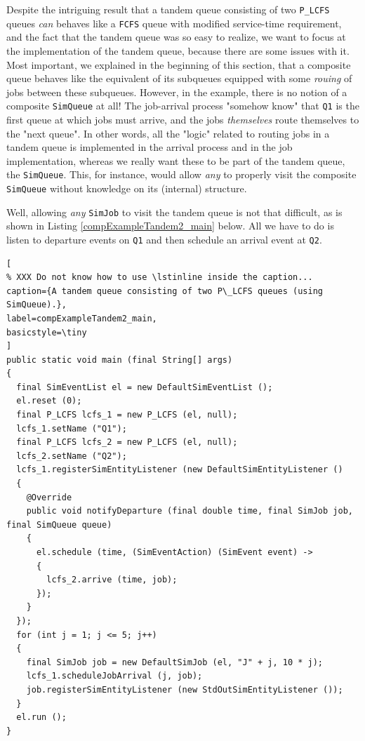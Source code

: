 \documentclass[12pt]{book}
\begin{document}
Despite the intriguing result that a tandem queue consisting of two
  \lstinline|P_LCFS| queues {\em can\/} behaves like a \lstinline|FCFS|
  queue with modified service-time requirement,
  and the fact that the tandem queue was so easy to realize,
  we want to focus at the implementation of the tandem queue,
  because there are some issues with it.
Most important,
  we explained in the beginning of this section,
  that a composite queue behaves like the equivalent
  of its subqueues equipped with some
  {\em rouing\/} of jobs between these subqueues.
However, in the example, there is no notion of a composite
  \lstinline|SimQueue| at all!
The job-arrival process "somehow know" that \lstinline|Q1|
  is the first queue at which jobs must arrive,
  and the jobs {\em themselves\/} route themselves
  to the "next queue".
In other words, all the "logic" related to routing jobs in a
  tandem queue is implemented in the arrival process and
  in the job implementation,
  whereas we really want these to be part of the tandem queue,
  the \lstinline|SimQueue|.
This, for instance, would allow {\em any\/} to properly visit the
  composite \lstinline{SimQueue} without knowledge on its
  (internal) structure.

Well, allowing {\em any\/} \lstinline|SimJob| to visit
  the tandem queue is not that difficult,
  as is shown in Listing \ref{compExampleTandem2_main} below.
All we have to do is listen to departure events
  on \lstinline|Q1| and then schedule an arrival event at \lstinline|Q2|.

\begin{lstlisting}[
% XXX Do not know how to use \lstinline inside the caption...
caption={A tandem queue consisting of two P\_LCFS queues (using SimQueue).},
label=compExampleTandem2_main,
basicstyle=\tiny
]
public static void main (final String[] args)
{    
  final SimEventList el = new DefaultSimEventList ();
  el.reset (0);
  final P_LCFS lcfs_1 = new P_LCFS (el, null);
  lcfs_1.setName ("Q1");
  final P_LCFS lcfs_2 = new P_LCFS (el, null);
  lcfs_2.setName ("Q2");
  lcfs_1.registerSimEntityListener (new DefaultSimEntityListener ()
  {
    @Override
    public void notifyDeparture (final double time, final SimJob job, final SimQueue queue)
    {
      el.schedule (time, (SimEventAction) (SimEvent event) ->
      {
        lcfs_2.arrive (time, job);
      });
    }
  });
  for (int j = 1; j <= 5; j++)
  {
    final SimJob job = new DefaultSimJob (el, "J" + j, 10 * j);
    lcfs_1.scheduleJobArrival (j, job);
    job.registerSimEntityListener (new StdOutSimEntityListener ());
  }
  el.run ();
}
\end{lstlisting}
\end{document}
